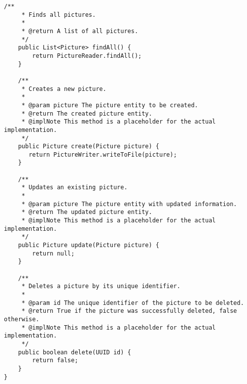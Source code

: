 \begin{lstlisting}[style=JavaStyle, caption={Infrastructure Class}, label={lst:infrastructure-codesnippet}]
    /**
     * Finds all pictures.
     *
     * @return A list of all pictures.
     */
    public List<Picture> findAll() {
        return PictureReader.findAll();
    }

    /**
     * Creates a new picture.
     *
     * @param picture The picture entity to be created.
     * @return The created picture entity.
     * @implNote This method is a placeholder for the actual implementation.
     */
    public Picture create(Picture picture) {
       return PictureWriter.writeToFile(picture);
    }

    /**
     * Updates an existing picture.
     *
     * @param picture The picture entity with updated information.
     * @return The updated picture entity.
     * @implNote This method is a placeholder for the actual implementation.
     */
    public Picture update(Picture picture) {
        return null;
    }

    /**
     * Deletes a picture by its unique identifier.
     *
     * @param id The unique identifier of the picture to be deleted.
     * @return True if the picture was successfully deleted, false otherwise.
     * @implNote This method is a placeholder for the actual implementation.
     */
    public boolean delete(UUID id) {
        return false;
    }
}
\end{lstlisting}
